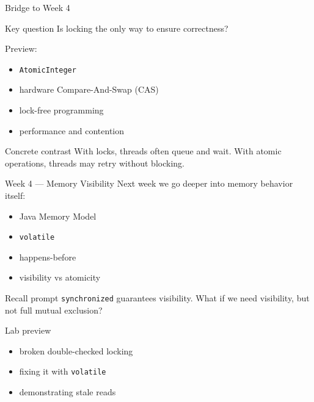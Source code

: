 \documentclass[aspectratio=169,11pt]{beamer}
\begin{document}
	
	\begin{frame}{Bridge to Week 4}
		\begin{alertblock}{Key question}
			Is locking the only way to ensure correctness?
		\end{alertblock}
		
		\bigskip
		
		Preview:
		\begin{itemize}
			\item \texttt{AtomicInteger}
			\item hardware Compare-And-Swap (CAS)
			\item lock-free programming
			\item performance and contention
		\end{itemize}
		
		\bigskip
		
		\begin{block}{Concrete contrast}
			With locks, threads often queue and wait.  
			With atomic operations, threads may retry without blocking.
		\end{block}
	\end{frame}
	
	\begin{frame}{Week 4 --- Memory Visibility}
		Next week we go deeper into memory behavior itself:
		
		\begin{itemize}
			\item Java Memory Model
			\item \texttt{volatile}
			\item happens-before
			\item visibility vs atomicity
		\end{itemize}
		
		\bigskip
		
		\begin{block}{Recall prompt}
			\texttt{synchronized} guarantees visibility.  
			What if we need visibility, but not full mutual exclusion?
		\end{block}
		
		\vspace{0.2cm}
		
		\begin{block}{Lab preview}
			\begin{itemize}
				\item broken double-checked locking
				\item fixing it with \texttt{volatile}
				\item demonstrating stale reads
			\end{itemize}
		\end{block}
	\end{frame}
	
\end{document}
